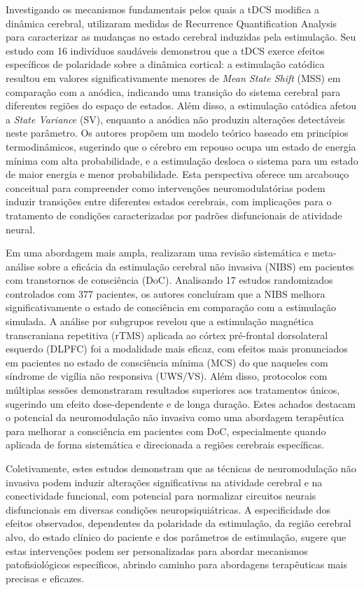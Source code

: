 Investigando os mecanismos fundamentais pelos quais a tDCS modifica a dinâmica cerebral,  utilizaram medidas de Recurrence Quantification Analysis para caracterizar as mudanças no estado cerebral induzidas pela estimulação. Seu estudo com 16 indivíduos saudáveis demonstrou que a tDCS exerce efeitos específicos de polaridade sobre a dinâmica cortical: a estimulação catódica resultou em valores significativamente menores de \textit{Mean State Shift} (MSS) em comparação com a anódica, indicando uma transição do sistema cerebral para diferentes regiões do espaço de estados. Além disso, a estimulação catódica afetou a \textit{State Variance} (SV), enquanto a anódica não produziu alterações detectáveis neste parâmetro. Os autores propõem um modelo teórico baseado em princípios termodinâmicos, sugerindo que o cérebro em repouso ocupa um estado de energia mínima com alta probabilidade, e a estimulação desloca o sistema para um estado de maior energia e menor probabilidade. Esta perspectiva oferece um arcabouço conceitual para compreender como intervenções neuromodulatórias podem induzir transições entre diferentes estados cerebrais, com implicações para o tratamento de condições caracterizadas por padrões disfuncionais de atividade neural.

Em uma abordagem mais ampla,  realizaram uma revisão sistemática e meta-análise sobre a eficácia da estimulação cerebral não invasiva (NIBS) em pacientes com transtornos de consciência (DoC). Analisando 17 estudos randomizados controlados com 377 pacientes, os autores concluíram que a NIBS melhora significativamente o estado de consciência em comparação com a estimulação simulada. A análise por subgrupos revelou que a estimulação magnética transcraniana repetitiva (rTMS) aplicada ao córtex pré-frontal dorsolateral esquerdo (DLPFC) foi a modalidade mais eficaz, com efeitos mais pronunciados em pacientes no estado de consciência mínima (MCS) do que naqueles com síndrome de vigília não responsiva (UWS/VS). Além disso, protocolos com múltiplas sessões demonstraram resultados superiores aos tratamentos únicos, sugerindo um efeito dose-dependente e de longa duração. Estes achados destacam o potencial da neuromodulação não invasiva como uma abordagem terapêutica para melhorar a consciência em pacientes com DoC, especialmente quando aplicada de forma sistemática e direcionada a regiões cerebrais específicas.

Coletivamente, estes estudos demonstram que as técnicas de neuromodulação não invasiva podem induzir alterações significativas na atividade cerebral e na conectividade funcional, com potencial para normalizar circuitos neurais disfuncionais em diversas condições neuropsiquiátricas. A especificidade dos efeitos observados, dependentes da polaridade da estimulação, da região cerebral alvo, do estado clínico do paciente e dos parâmetros de estimulação, sugere que estas intervenções podem ser personalizadas para abordar mecanismos patofisiológicos específicos, abrindo caminho para abordagens terapêuticas mais precisas e eficazes.

